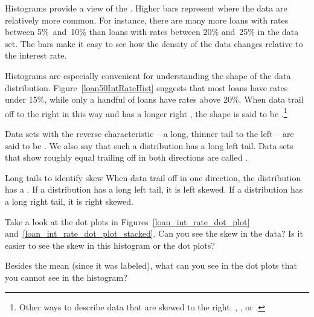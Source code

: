 Histograms provide a view of the .
Higher bars represent where the data are relatively more common.
For instance, there are many more loans with rates between
5\%~and~10\% than loans with rates between 20\% and~25\%
in the data set.
The bars make it easy to see how the density of the data
changes relative to the interest rate.

Histograms are especially convenient for understanding the
shape of the data distribution\label{shapeFirstDiscussed}.
Figure~\ref{loan50IntRateHist} suggests that most loans
have rates under 15\%, while only a handful
of loans have rates above 20\%.
When data trail off to the right in this way
and has a longer right ,
the shape is said to be
.\footnote{Other
  ways to describe data that are skewed to the right:
  ,
  ,
  or .}

Data sets with the reverse characteristic --
a long, thinner tail to the left --
are said to be .
We also say that such a distribution has a long left tail.
Data sets that show roughly equal trailing off in both
directions are called .

\begin{onebox}{Long tails to identify skew}
  When data trail off in one direction, the distribution
  has a . 
  If a distribution has a long left tail, it is left skewed.
  If a distribution has a long right tail, it is right skewed.
\end{onebox}

\begin{exercisewrap}
\begin{nexercise}
Take a look at the dot plots in
Figures~\ref{loan_int_rate_dot_plot}
and~\ref{loan_int_rate_dot_plot_stacked}.
Can you see the skew in the data? Is it easier to see the
skew in this histogram or the dot plots?\footnotemark{}
\end{nexercise}
\end{exercisewrap}

\begin{exercisewrap}
\begin{nexercise}
Besides the mean (since it was labeled), what can you see
in the dot plots that you cannot see in the
histogram?\footnotemark{}
\end{nexercise}
\end{exercisewrap}

